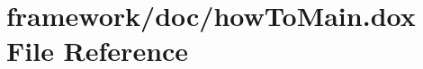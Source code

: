 \hypertarget{how_to_main_8dox}{}\section{framework/doc/how\+To\+Main.dox File Reference}
\label{how_to_main_8dox}
